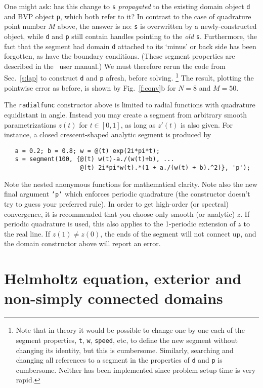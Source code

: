 \documentclass[11pt]{article}
\begin{document}
One might ask: has this change to {\tt s} {\em propagated}
to the existing domain
object {\tt d} and BVP object {\tt p}, which both refer to it?
In contrast to the case of quadrature point number $M$ above,
the answer is no:
{\tt s} is overwritten by a newly-constructed object, while
{\tt d} and {\tt p} still contain handles pointing to the {\em old}
{\tt s}.
Furthermore, the fact that the segment had domain {\tt d}
attached to its `minus' or back side has been forgotten, as have the
boundary conditions.
(These segment properties are described in the \mpspack\ user manual.)
We must therefore rerun the code from Sec.~\ref{s:lap}
to construct {\tt d} and {\tt p} afresh, before solving.%
  \footnote{Note that in theory it would be possible to
    change one by one each of the segment properties, {\tt t}, {\tt w},
    {\tt speed}, etc, to define the new segment without changing its identity,
    but this is cumbersome. Similarly, searching and changing
    all references to a segment in the properties of {\tt d} and {\tt p}
    is cumbersome. Neither has been implemented since problem setup time is
    very rapid.}
The result, plotting the pointwise error as before,
is shown by Fig.~\ref{f:conv}b for $N=8$ and $M=50$.

The {\tt radialfunc} constructor above is limited to radial functions
with quadrature equidistant
in angle. Instead you may create a segment from arbitrary
smooth parametrizations $z(t)$ for $t \in[0,1]$, as long as $z'(t)$
is also given. For instance, a closed crescent-shaped analytic segment is
produced by 
\begin{verbatim}
   a = 0.2; b = 0.8; w = @(t) exp(2i*pi*t);
   s = segment(100, {@(t) w(t)-a./(w(t)+b), ...
                     @(t) 2i*pi*w(t).*(1 + a./(w(t) + b).^2)}, 'p');
\end{verbatim}
Note the nested anonymous functions for mathematical clarity.
Note also the new final argument {\tt 'p'} which enforces
periodic quadrature (the constructor doesn't try to guess your preferred rule).
In order to get high-order (or spectral) convergence, it is recommended
that you choose only smooth (or analytic) $z$.
If periodic quadrature is used,
this also applies to the 1-periodic extension of $z$ to the real line.
If $z(1)\neq z(0)$, the ends of the segment will not connect
up, and the domain constructor above will report an error.


\section{Helmholtz equation, exterior and non-simply connected domains}
\end{document}
